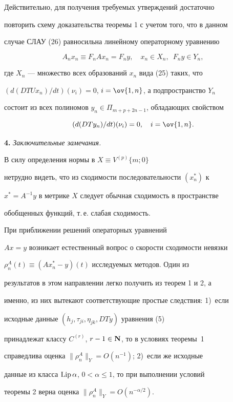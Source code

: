 


Действительно, для получения требуемых утверждений достаточно 


повторить схему доказательства теоремы 1 с учетом того, что в данном 


случае СЛАУ (26) равносильна линейному операторному уравнению 


$$ 


A_n x_n\equiv F_n A x_n=F_n y,\quad x_n\in X_n,\ \; F_n y\in Y_n, 


$$ 


где $X_n$ --- множество всех образований $x_n$ вида (25) таких, что 


$(d(D T U x_n)/d t)(\nu_i)=0$, $i=\ov{1,n}$, а подпространство $Y_n$ 


состоит из всех полиномов $y_n\in\Pi_{m+p+2n-1}$, обладающих свойством 


$$ 


(d(D T y_n)/d t)(\nu_i)=0,\quad i=\ov{1,n}. 


$$ 


\medskip


 


{\bf 4.} {\it Заключительные замечания.} 


 


\begin{note} 


В силу определения нормы в $X\equiv V^{(p)}\{m;0\}$ 


нетрудно видеть, что из сходимости последовательности $(x^*_n)$ к 


$x^*=A^{-1}y$ в метрике $X$ следует обычная сходимость в пространстве 


обобщенных функций, т.\,е. слабая сходимость. 


\end{note} 


 


\begin{note} 


При приближении решений операторных уравнений 


$Ax=y$ возникает естественный вопрос о скорости сходимости невязки 


$\rho^A_n(t)\equiv(Ax^*_n-y)(t)$ исследуемых методов. Один из 


результатов в этом направлении легко получить из теорем 1 и 2, а 


именно, из них вытекают соответствующие простые следствия: 1)~если 


исходные данные $(h_j,\tau_{j i},\eta_{j k}, D T y)$ уравнения (5) 


принадлежат классу $C^{(r)}$, $r-1\in\bold N$, то в условиях теоремы~1 


справедлива оценка $\|\rho^A_n\|_Y=O(n^{-1})$; 2)~если же исходные 


данные из класса $\operatorname{Lip}\alpha$, $0<\alpha\le1$, то при выполнении условий 


теоремы 2 верна оценка $\|\rho^A_n\|_Y=O(n^{-\alpha/2})$. 


\end{note} 



